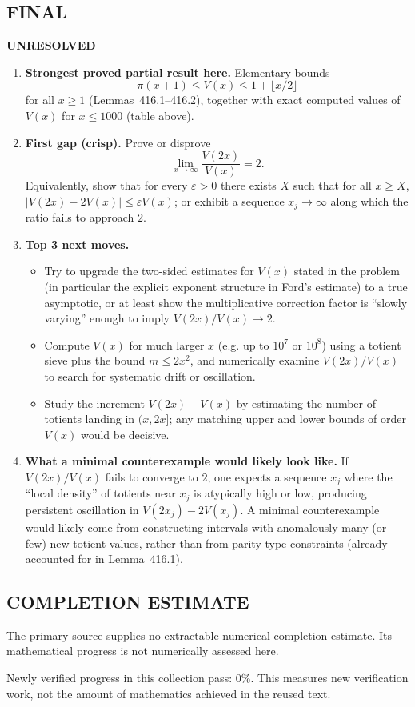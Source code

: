 \subsection*{FINAL}
\textbf{UNRESOLVED}
\begin{enumerate}
\item[(i)] \textbf{Strongest proved partial result here.}
Elementary bounds
\[
\pi(x+1)\le V(x)\le 1+\lfloor x/2\rfloor
\]
for all $x\ge 1$ (Lemmas~416.1--416.2), together with exact computed values of $V(x)$ for $x\le 1000$ (table above).
\item[(ii)] \textbf{First gap (crisp).}
Prove or disprove
\[
\lim_{x\to\infty}\frac{V(2x)}{V(x)}=2.
\]
Equivalently, show that for every $\varepsilon>0$ there exists $X$ such that for all $x\ge X$,
$\big|V(2x)-2V(x)\big|\le \varepsilon V(x)$; or exhibit a sequence $x_j\to\infty$ along which the ratio fails to approach $2$.
\item[(iii)] \textbf{Top 3 next moves.}
\begin{itemize}
\item Try to upgrade the two-sided estimates for $V(x)$ stated in the problem (in particular the explicit exponent structure in Ford's estimate) to a true asymptotic, or at least show the multiplicative correction factor is ``slowly varying'' enough to imply $V(2x)/V(x)\to 2$.
\item Compute $V(x)$ for much larger $x$ (e.g. up to $10^7$ or $10^8$) using a totient sieve plus the bound $m\le 2x^2$, and numerically examine $V(2x)/V(x)$ to search for systematic drift or oscillation.
\item Study the increment $V(2x)-V(x)$ by estimating the number of totients landing in $(x,2x]$; any matching upper and lower bounds of order $V(x)$ would be decisive.
\end{itemize}
\item[(iv)] \textbf{What a minimal counterexample would likely look like.}
If $V(2x)/V(x)$ fails to converge to $2$, one expects a sequence $x_j$ where the ``local density'' of totients near $x_j$ is atypically high or low, producing persistent oscillation in $V(2x_j)-2V(x_j)$. A minimal counterexample would likely come from constructing intervals with anomalously many (or few) new totient values, rather than from parity-type constraints (already accounted for in Lemma~416.1).
\end{enumerate}



\subsection*{COMPLETION ESTIMATE}
The primary source supplies no extractable numerical completion estimate. Its mathematical progress is not numerically assessed here.

Newly verified progress in this collection pass: $0\%$. This measures new verification work, not the amount of mathematics achieved in the reused text.
